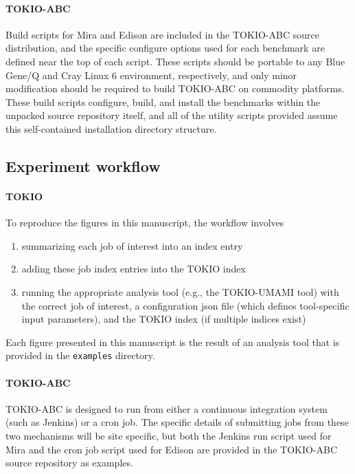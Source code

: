 \paragraph{TOKIO-ABC} Build scripts for Mira and Edison are included in the TOKIO-ABC source distribution, and the specific configure options used for each benchmark are defined near the top of each script.
These scripts should be portable to any Blue Gene/Q and Cray Linux 6 environment, respectively, and only minor modification should be required to build TOKIO-ABC on commodity platforms.
These build scripts configure, build, and install the benchmarks within the unpacked source repository itself, and all of the utility scripts provided assume this self-contained installation directory structure.

\subsection{Experiment workflow}

\paragraph{TOKIO}
To reproduce the figures in this manuscript, the workflow involves

\begin{enumerate}
\item summarizing each job of interest into an index entry
\item adding these job index entries into the TOKIO index
\item running the appropriate analysis tool (e.g., the TOKIO-UMAMI tool) with the correct job of interest, a configuration json file (which defines tool-specific input parameters), and the TOKIO index (if multiple indices exist)
\end{enumerate}

Each figure presented in this manuscript is the result of an analysis tool that is provided in the \texttt{examples} directory.

\paragraph{TOKIO-ABC}
TOKIO-ABC is designed to run from either a continuous integration system (such as Jenkins) or a cron job.
The specific details of submitting jobs from these two mechanisms will be site specific, but both the Jenkins run script used for Mira and the cron job script used for Edison are provided in the TOKIO-ABC source repository as examples.

